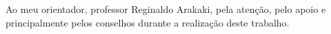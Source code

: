 \begin{agradecimentos}

Ao meu orientador, professor Reginaldo Arakaki, pela atenção, pelo apoio e
principalmente pelos conselhos durante a realização deste trabalho.

\end{agradecimentos}
